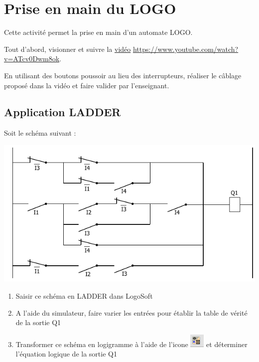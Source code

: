\section{Prise en main du LOGO}
\begin{UPSTIactivite}
    Cette activité permet la prise en main d'un automate LOGO. 

    Tout d'abord, visionner et suivre la \href{https://www.youtube.com/watch?v=ATcv0Dwm8ok}{vidéo} \url{https://www.youtube.com/watch?v=ATcv0Dwm8ok}.
    
    En utilisant des boutons poussoir au lieu des interrupteurs, réaliser le câblage proposé dans la vidéo et faire valider par l'enseignant. 
\end{UPSTIactivite}
\pagebreak

\pagebreak
\subsection{Application LADDER}
\begin{UPSTIactivite}[][LADDER]
    Soit le schéma suivant : 

    \begin{center}
        \includegraphics[width=.8\textwidth]{images/TP01_Ex01_cablage}
    \end{center}

    \begin{enumerate}
        \item Saisir ce schéma en LADDER dans LogoSoft
        \item A l'aide du simulateur, faire varier les entrées pour établir la table de vérité de la sortie Q1
        \item Transformer ce schéma en logigramme à l'aide de l'icone \includegraphics[height=\fontcharht\font`\B]{images/logoSoft_laderToSchema.png} et déterminer l'équation logique de la sortie Q1 
    \end{enumerate}
\end{UPSTIactivite}

